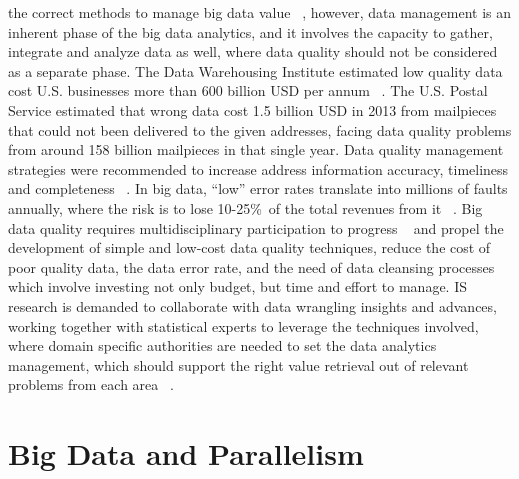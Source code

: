 the correct methods to manage big data value ~\cite{Lavalle2011}, however, data management is an
inherent phase of the big data analytics, and it involves the capacity to gather, integrate
and analyze data as well, where data quality should not be considered as a separate
phase.
The Data Warehousing Institute estimated low quality data cost U.S. businesses
more than 600 billion USD per annum ~\cite{Eckerson2002}. The U.S. Postal Service estimated that
wrong data cost 1.5 billion USD in 2013 from mailpieces that could not been delivered
to the given addresses, facing data quality problems from around 158 billion mailpieces
in that single year. Data quality management strategies were recommended to increase
address information accuracy, timeliness and completeness ~\cite{USAPostService2014}. In big data, “low”
error rates translate into millions of faults annually, where the risk is to lose 10-25\%\ of
the total revenues from it ~\cite{Eckerson2002}.
Big data quality requires multidisciplinary participation to progress ~\cite{Hazen2014} and propel the development of simple and low-cost data quality techniques, reduce the cost of
poor quality data, the data error rate, and the need of data cleansing processes which
involve investing not only budget, but time and effort to manage. IS research is demanded to collaborate with data wrangling insights and advances, working together
with statistical experts to leverage the techniques involved, where domain specific authorities are needed to set the data analytics management, which should support the
right value retrieval out of relevant problems from each area ~\cite{Hazen2014}.

\section{Big Data and Parallelism}

